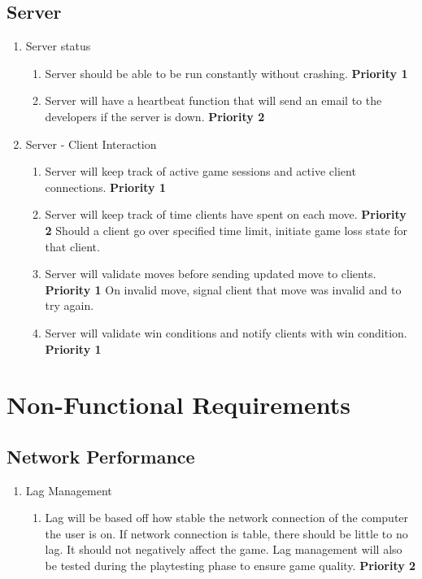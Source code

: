 \documentclass[10pt]{article}
\begin{document}
\subsection{Server}

\begin{enumerate}[resume*]
    \item Server status
    \begin{enumerate}[label*=\arabic*.]
        \item Server should be able to be run constantly without crashing. \textbf{Priority 1}
        \item Server will have a heartbeat function that will send an email to the developers if the server is down. \textbf{Priority 2}
    \end{enumerate}
    \item Server - Client Interaction
    \begin{enumerate}[label*=\arabic*.]
        \item Server will keep track of active game sessions and active client connections. \textbf{Priority 1}
        \item Server will keep track of time clients have spent on each move. \textbf{Priority 2}
            \subitem Should a client go over specified time limit, initiate game loss state for that client.
        \item Server will validate moves before sending updated move to clients. \textbf{Priority 1}
            \subitem On invalid move, signal client that move was invalid and to try again.
        \item Server will validate win conditions and notify clients with win condition. \textbf{Priority 1}
    \end{enumerate}
\end{enumerate}

\section{Non-Functional Requirements}

\subsection{Network Performance}

\begin{enumerate}[label*=N\arabic*.]
    \item Lag Management
	 \begin{enumerate}[label*=\arabic*.]
        \item Lag will be based off how stable the network connection of the computer the user is on. If network connection is table, there should be little to no lag. It should not negatively affect the game. Lag management will also be tested during the playtesting phase to ensure game quality. \textbf{Priority 2}
	  \end{enumerate}
\end{enumerate}
\end{document}
